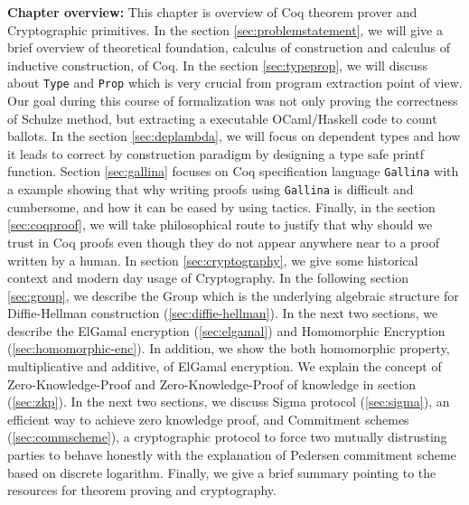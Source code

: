 \textbf{Chapter overview:}
 This chapter is overview of Coq theorem prover and Cryptographic primitives. 
 In the section \ref{sec:problemstatement}, we will give a brief overview of 
 theoretical foundation, calculus of construction and calculus of inductive 
 construction, of Coq.  In the section \ref{sec:typeprop}, we will discuss about 
 \texttt{Type} and \texttt{Prop}
 which is very crucial from program extraction point of view.  Our goal during 
 this course of formalization was not only proving the correctness of 
 Schulze method, but extracting a executable OCaml/Haskell code to count 
 ballots.  In the section \ref{sec:deplambda}, we will focus 
 on dependent types and  how it leads to correct by construction paradigm
 by designing a  type safe printf function. 
 Section \ref{sec:gallina} focuses on Coq specification language 
 \texttt{Gallina} with a example showing that why writing proofs using  
 \texttt{Gallina} is difficult and cumbersome, and how it can be eased by 
 using tactics. Finally, in the section  \ref{sec:coqproof}, we will take 
 philosophical route to justify that why should we trust in Coq proofs 
 even though they do not appear anywhere near to a proof written by 
 a human.  In section \ref{sec:cryptography}, we give some historical 
 context and modern day usage of Cryptography.  In the following section 
 \ref{sec:group}, we describe the  Group which is the underlying 
 algebraic structure for Diffie-Hellman construction (\ref{sec:diffie-hellman}). 
 In the next two sections, we describe the ElGamal encryption (\ref{sec:elgamal}) 
 and Homomorphic Encryption (\ref{sec:homomorphic-enc}). In addition, 
 we show the both homomorphic property, multiplicative and additive, 
 of ElGamal encryption. We explain the concept of Zero-Knowledge-Proof 
 and Zero-Knowledge-Proof  of knowledge in section (\ref{sec:zkp}). 
 In the next two sections, we discuss Sigma protocol (\ref{sec:sigma}), 
 an efficient way to achieve zero knowledge proof, and Commitment schemes
 (\ref{sec:commscheme}), a cryptographic protocol to force two mutually 
 distrusting parties to behave honestly with the explanation of Pedersen 
 commitment scheme based on discrete logarithm.  Finally, we give a 
 brief summary pointing to the resources for theorem proving and 
 cryptography. 
 


